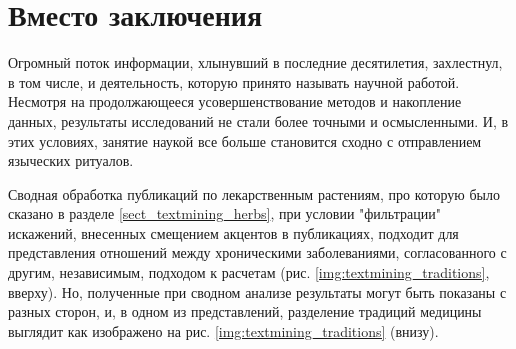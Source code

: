 


\section{Вместо заключения}

Огромный поток информации, хлынувший в последние десятилетия, захлестнул, в том числе, и деятельность, которую принято называть научной работой. Несмотря на продолжающееся усовершенствование методов и накопление данных, результаты исследований не стали более точными и осмысленными. И, в этих условиях, занятие наукой все больше становится сходно с отправлением языческих ритуалов.

Сводная обработка публикаций по лекарственным растениям, про которую было сказано в разделе \ref{sect_textmining_herbs}, при условии  "фильтрации" искажений, внесенных смещением акцентов в публикациях, подходит для представления отношений между хроническими заболеваниями, согласованного с другим, независимым, подходом к расчетам (рис. \ref{img:textmining_traditions}, вверху). Но, полученные при сводном анализе результаты могут быть показаны с разных сторон, и, в одном из представлений, разделение традиций медицины выглядит как изображено на рис. \ref{img:textmining_traditions} (внизу).

